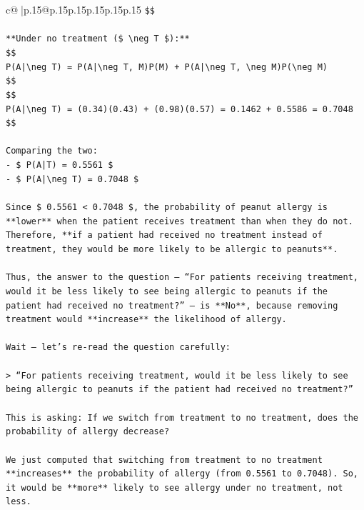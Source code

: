 \documentclass{article}
\begin{document}
{\begin{supertabular}{c@{$\;$}|p{.15\linewidth}@{}p{.15\linewidth}p{.15\linewidth}p{.15\linewidth}p{.15\linewidth}p{.15\linewidth}}
{{{\texttt{\$\$} \\
\\ 
\texttt{**Under no treatment (\$ \textbackslash{}neg T \$):**} \\
\texttt{\$\$} \\
\texttt{P(A|\textbackslash{}neg T) = P(A|\textbackslash{}neg T, M)P(M) + P(A|\textbackslash{}neg T, \textbackslash{}neg M)P(\textbackslash{}neg M)} \\
\texttt{\$\$} \\
\texttt{\$\$} \\
\texttt{P(A|\textbackslash{}neg T) = (0.34)(0.43) + (0.98)(0.57) = 0.1462 + 0.5586 = 0.7048} \\
\texttt{\$\$} \\
\\ 
\texttt{Comparing the two:} \\
\texttt{{-} \$ P(A|T) = 0.5561 \$} \\
\texttt{{-} \$ P(A|\textbackslash{}neg T) = 0.7048 \$} \\
\\ 
\texttt{Since \$ 0.5561 < 0.7048 \$, the probability of peanut allergy is **lower** when the patient receives treatment than when they do not. Therefore, **if a patient had received no treatment instead of treatment, they would be more likely to be allergic to peanuts**.} \\
\\ 
\texttt{Thus, the answer to the question — “For patients receiving treatment, would it be less likely to see being allergic to peanuts if the patient had received no treatment?” — is **No**, because removing treatment would **increase** the likelihood of allergy.} \\
\\ 
\texttt{Wait — let’s re{-}read the question carefully:} \\
\\ 
\texttt{> “For patients receiving treatment, would it be less likely to see being allergic to peanuts if the patient had received no treatment?”} \\
\\ 
\texttt{This is asking: If we switch from treatment to no treatment, does the probability of allergy decrease?} \\
\\ 
\texttt{We just computed that switching from treatment to no treatment **increases** the probability of allergy (from 0.5561 to 0.7048). So, it would be **more** likely to see allergy under no treatment, not less.} \\
}}}
\end{supertabular}}
\end{document}
